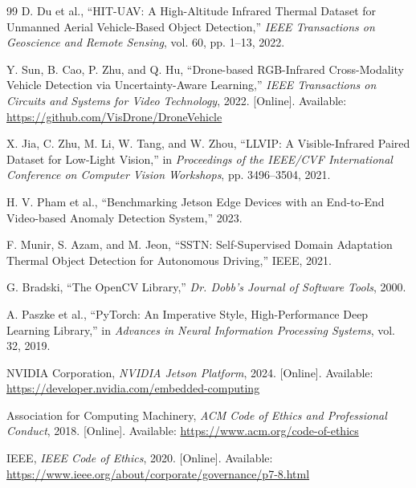 \begin{thebibliography}{99}
D. Du et al.,
``HIT-UAV: A High-Altitude Infrared Thermal Dataset for Unmanned Aerial Vehicle-Based
Object Detection,''
\textit{IEEE Transactions on Geoscience and Remote Sensing}, vol. 60, pp. 1--13, 2022.

Y. Sun, B. Cao, P. Zhu, and Q. Hu,
``Drone-based RGB-Infrared Cross-Modality Vehicle Detection via Uncertainty-Aware
Learning,''
\textit{IEEE Transactions on Circuits and Systems for Video Technology}, 2022.
[Online]. Available: \url{https://github.com/VisDrone/DroneVehicle}

X. Jia, C. Zhu, M. Li, W. Tang, and W. Zhou,
``LLVIP: A Visible-Infrared Paired Dataset for Low-Light Vision,''
in \textit{Proceedings of the IEEE/CVF International Conference on Computer Vision
Workshops}, pp. 3496--3504, 2021.

H. V. Pham et al.,
``Benchmarking Jetson Edge Devices with an End-to-End Video-based Anomaly Detection
System,'' 2023.

F. Munir, S. Azam, and M. Jeon,
``SSTN: Self-Supervised Domain Adaptation Thermal Object Detection for Autonomous
Driving,'' IEEE, 2021.

G. Bradski,
``The OpenCV Library,''
\textit{Dr. Dobb's Journal of Software Tools}, 2000.

A. Paszke et al.,
``PyTorch: An Imperative Style, High-Performance Deep Learning Library,''
in \textit{Advances in Neural Information Processing Systems}, vol. 32, 2019.

NVIDIA Corporation,
\textit{NVIDIA Jetson Platform}, 2024.
[Online]. Available: \url{https://developer.nvidia.com/embedded-computing}

Association for Computing Machinery,
\textit{ACM Code of Ethics and Professional Conduct}, 2018.
[Online]. Available: \url{https://www.acm.org/code-of-ethics}

IEEE,
\textit{IEEE Code of Ethics}, 2020.
[Online]. Available: \url{https://www.ieee.org/about/corporate/governance/p7-8.html}

\end{thebibliography}
